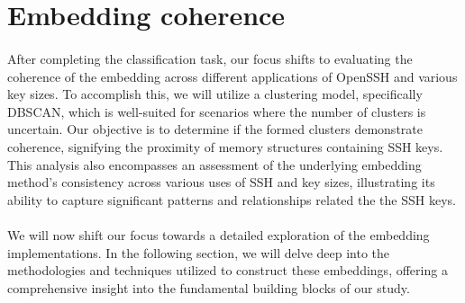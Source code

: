     \section{Embedding coherence}
    \paragraph{}After completing the classification task, our focus shifts to evaluating the coherence of the embedding across different applications of OpenSSH and various key sizes. To accomplish this, we will utilize a clustering model, specifically DBSCAN, which is well-suited for scenarios where the number of clusters is uncertain. Our objective is to determine if the formed clusters demonstrate coherence, signifying the proximity of memory structures containing SSH keys. This analysis also encompasses an assessment of the underlying embedding method's consistency across various uses of SSH and key sizes, illustrating its ability to capture significant patterns and relationships related the the SSH keys.

    \paragraph{}We will now shift our focus towards a detailed exploration of the embedding implementations. In the following section, we will delve deep into the methodologies and techniques utilized to construct these embeddings, offering a comprehensive insight into the fundamental building blocks of our study.